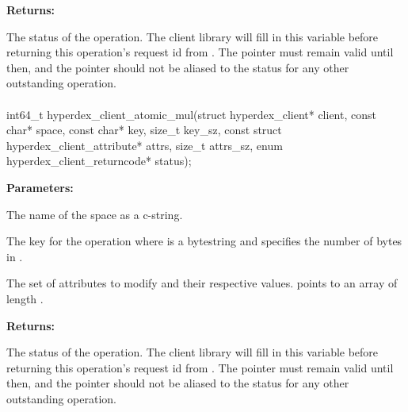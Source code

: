 \noindent\textbf{Returns:}
\begin{description}[labelindent=\widthof{{\code{status}}},leftmargin=*,noitemsep,nolistsep,align=right]
\item[\code{status}] The status of the operation.  The client library will fill in this variable before returning this operation's request id from .  The pointer must remain valid until then, and the pointer should not be aliased to the status for any other outstanding operation.
\end{description}

\paragraph{}
\begin{ccode}
int64_t hyperdex_client_atomic_mul(struct hyperdex_client* client,
                const char* space,
                const char* key, size_t key_sz,
                const struct hyperdex_client_attribute* attrs, size_t attrs_sz,
                enum hyperdex_client_returncode* status);
\end{ccode}
\funcdesc 

\noindent\textbf{Parameters:}
\begin{description}[labelindent=\widthof{{\code{attrs}, \code{attrs\_sz}}},leftmargin=*,noitemsep,nolistsep,align=right]
\item[\code{space}] The name of the space as a c-string.
\item[\code{key}, \code{key\_sz}] The key for the operation where  is a bytestring and  specifies the number of bytes in .
\item[\code{attrs}, \code{attrs\_sz}] The set of attributes to modify and their respective values.   points to an array of length .
\end{description}

\noindent\textbf{Returns:}
\begin{description}[labelindent=\widthof{{\code{status}}},leftmargin=*,noitemsep,nolistsep,align=right]
\item[\code{status}] The status of the operation.  The client library will fill in this variable before returning this operation's request id from .  The pointer must remain valid until then, and the pointer should not be aliased to the status for any other outstanding operation.
\end{description}

